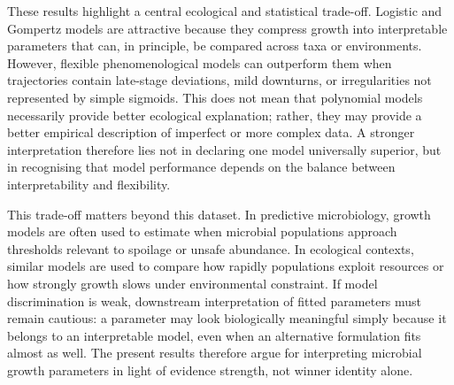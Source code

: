 \documentclass[11pt]{article}
\begin{document}
These results highlight a central ecological and statistical trade-off. Logistic and Gompertz models are attractive because they compress growth into interpretable parameters that can, in principle, be compared across taxa or environments. However, flexible phenomenological models can outperform them when trajectories contain late-stage deviations, mild downturns, or irregularities not represented by simple sigmoids. This does not mean that polynomial models necessarily provide better ecological explanation; rather, they may provide a better empirical description of imperfect or more complex data. A stronger interpretation therefore lies not in declaring one model universally superior, but in recognising that model performance depends on the balance between interpretability and flexibility.

This trade-off matters beyond this dataset. In predictive microbiology, growth models are often used to estimate when microbial populations approach thresholds relevant to spoilage or unsafe abundance. In ecological contexts, similar models are used to compare how rapidly populations exploit resources or how strongly growth slows under environmental constraint. If model discrimination is weak, downstream interpretation of fitted parameters must remain cautious: a parameter may look biologically meaningful simply because it belongs to an interpretable model, even when an alternative formulation fits almost as well. The present results therefore argue for interpreting microbial growth parameters in light of evidence strength, not winner identity alone.
\end{document}

